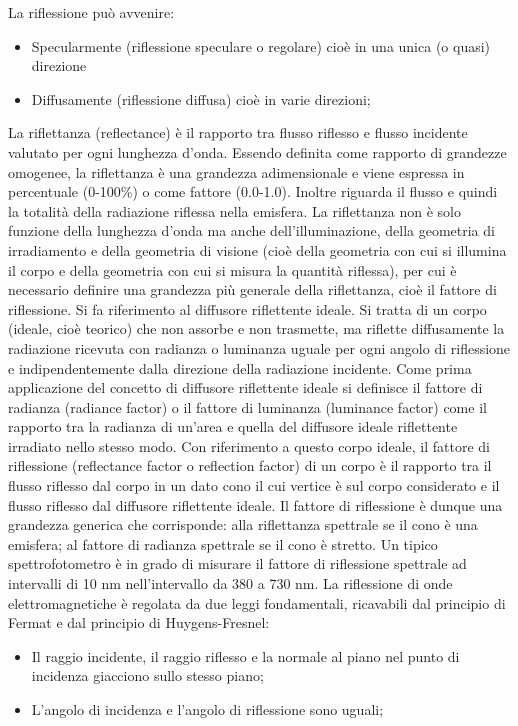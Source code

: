 La riflessione può avvenire:
\begin{itemize}
\item Specularmente (riflessione speculare o regolare) cioè in una unica (o quasi) direzione
\item Diffusamente (riflessione diffusa) cioè in varie direzioni;
\end{itemize}
La riflettanza (reflectance) è il rapporto tra flusso riflesso e flusso incidente valutato per ogni lunghezza d'onda. Essendo definita come rapporto di grandezze omogenee, la riflettanza è una grandezza adimensionale e viene espressa in percentuale (0-100\%) o come fattore (0.0-1.0). Inoltre riguarda il flusso e quindi la totalità della radiazione riflessa nella emisfera.
La riflettanza non è solo funzione della lunghezza d'onda ma anche dell'illuminazione, della geometria di irradiamento e della geometria di visione (cioè della geometria con cui si illumina il corpo e della geometria con cui si misura la quantità riflessa), per cui è necessario definire una grandezza più generale della riflettanza, cioè il fattore di riflessione.
Si fa riferimento al diffusore riflettente ideale. Si tratta di un corpo (ideale, cioè teorico) che non assorbe e non trasmette, ma riflette diffusamente la radiazione ricevuta con radianza o luminanza uguale per ogni angolo di riflessione e indipendentemente dalla direzione della radiazione incidente. Come prima applicazione del concetto di diffusore riflettente ideale si definisce il fattore di radianza (radiance factor) o il fattore di luminanza (luminance factor) come il rapporto tra la radianza di un'area e quella del diffusore ideale riflettente irradiato nello stesso modo.
Con riferimento a questo corpo ideale, il fattore di riflessione (reflectance factor o reflection factor) di un corpo è il rapporto tra il flusso riflesso dal corpo in un dato cono il cui vertice è sul corpo considerato e il flusso riflesso dal diffusore riflettente ideale.
Il fattore di riflessione è dunque una grandezza generica che corrisponde:
alla riflettanza spettrale se il cono è una emisfera;
al fattore di radianza spettrale se il cono è stretto.
Un tipico spettrofotometro è in grado di misurare il fattore di riflessione spettrale ad intervalli di 10 nm nell'intervallo da 380 a 730 nm.
La riflessione di onde elettromagnetiche è regolata da due leggi fondamentali, ricavabili dal principio di Fermat e dal principio di Huygens-Fresnel:

\begin{itemize}
\item Il raggio incidente, il raggio riflesso e la normale al piano nel punto di incidenza giacciono sullo stesso piano;
\item L'angolo di incidenza e l'angolo di riflessione sono uguali;
\end{itemize}

